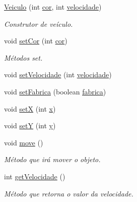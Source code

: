 \begin{DoxyCompactItemize}
\item 
\mbox{\label{class_veiculo_a5ea5d42f464f3f8844a793c4e144c2c2}} 
\mbox{\hyperlink{class_veiculo_a5ea5d42f464f3f8844a793c4e144c2c2}{Veiculo}} (int \mbox{\hyperlink{class_veiculo_aad500265aeb92689ca66ec5bd87787a9}{cor}}, int \mbox{\hyperlink{class_veiculo_a2edf5e3132b1c2504c441dc095dc7e0e}{velocidade}})
\begin{DoxyCompactList}\small\item\em Construtor de veículo. \end{DoxyCompactList}\item 
void \mbox{\hyperlink{class_veiculo_ab7fc7e6551ab238df0fb51a1a5c7d66f}{set\+Cor}} (int \mbox{\hyperlink{class_veiculo_aad500265aeb92689ca66ec5bd87787a9}{cor}})
\begin{DoxyCompactList}\small\item\em Métodos set. \end{DoxyCompactList}\item 
void \mbox{\hyperlink{class_veiculo_a45be3eedbb5c60b9f422f7a7f9f145cd}{set\+Velocidade}} (int \mbox{\hyperlink{class_veiculo_a2edf5e3132b1c2504c441dc095dc7e0e}{velocidade}})
\item 
void \mbox{\hyperlink{class_veiculo_ae9a07a54a5824a9e8cace2c742034956}{set\+Fabrica}} (boolean \mbox{\hyperlink{class_veiculo_a23d377a69bdf558ebedb5bc35dcdebf5}{fabrica}})
\item 
void \mbox{\hyperlink{class_veiculo_a84b2207a013e6cd869959b73a93864b8}{setX}} (int \mbox{\hyperlink{class_veiculo_a069917a284297fe5b385258b2afd9ad6}{x}})
\item 
void \mbox{\hyperlink{class_veiculo_a57cb54424b47643d8b388c72dbaf43b1}{setY}} (int \mbox{\hyperlink{class_veiculo_af25046404db7c2786c0d9e468bb1fb64}{y}})
\item 
void \mbox{\hyperlink{class_veiculo_a3341b0ed6b4d34db990a31f7a499ae80}{move}} ()
\begin{DoxyCompactList}\small\item\em Método que irá mover o objeto. \end{DoxyCompactList}\item 
\mbox{\label{class_veiculo_a29ede179017c05f28aebf02922a5478b}} 
int \mbox{\hyperlink{class_veiculo_a29ede179017c05f28aebf02922a5478b}{get\+Velocidade}} ()
\begin{DoxyCompactList}\small\item\em Método que retorna o valor da velocidade. \end{DoxyCompactList}\item 

\end{DoxyCompactItemize}
